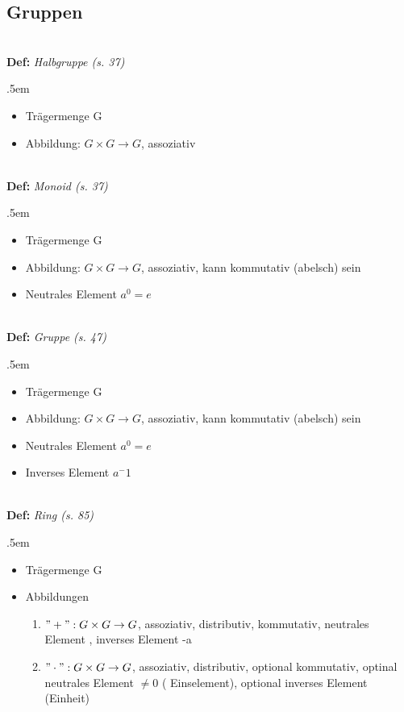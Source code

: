 \documentclass[twocolumn, 10pt]{article}
\newenvironment {definition}
                [1][]
                {\noindent\\{\bf
                Def:}\emph{
                #1}\indent\begin{addmargin}{.5em}}{\end{addmargin}}
\begin{document}
\subsection*{Gruppen}

\begin{definition}[Halbgruppe (s. 37)]
\begin{itemize}
  \item Trägermenge G
  \item Abbildung: $G \times G \rightarrow G$, assoziativ
\end{itemize}
\end{definition}

\begin{definition}[Monoid (s. 37)]
\begin{itemize}
  \item Trägermenge G
  \item Abbildung: $G \times G \rightarrow G$, assoziativ, kann kommutativ
  (abelsch) sein
  \item Neutrales Element $a^0 = e$
\end{itemize}
\end{definition}

\begin{definition}[Gruppe (s. 47)]
\begin{itemize}
  \item Trägermenge G
  \item Abbildung: $G \times G \rightarrow G$, assoziativ, kann kommutativ
  (abelsch) sein
  \item Neutrales Element $a^0 = e$
  \item Inverses Element $a^-1$
\end{itemize}
\end{definition}

\begin{definition}[Ring (s. 85)]
\begin{itemize}
  \item Trägermenge G
  \item Abbildungen
  	\begin{enumerate}
    	\item $"+": G\times G \rightarrow G$, assoziativ, distributiv, kommutativ,
    	neutrales Element \grqq , inverses Element \glqq -a\grqq
    	\item $"\cdot ": G\times G \rightarrow G$, assoziativ, distributiv,
    	optional kommutativ, optinal neutrales Element $\neq 0$ (\glqq
    	Einselement\grqq ), optional inverses Element (\glqq Einheit\grqq )
  	\end{enumerate}
\end{itemize}
\end{definition}
\end{document}

